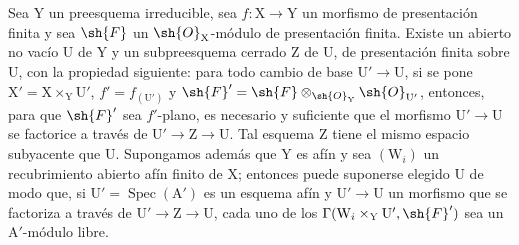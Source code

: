 \begin{proposition}[11.4.5]
\label{IV.11.4.5}
Sea $\mathrm{Y}$ un preesquema irreducible, sea $f:\mathrm{X}\to\mathrm{Y}$ un morfismo de
presentación finita y sea $\sh{F}$ un $\sh{O}_\mathrm{X}$-módulo de presentación finita. Existe un abierto no vacío $\mathrm{U}$
de $\mathrm{Y}$ y un subpreesquema cerrado $\mathrm{Z}$ de $\mathrm{U}$, de presentación finita sobre $\mathrm{U}$, con la propiedad siguiente:
para todo cambio de base $\mathrm{U}'\to\mathrm{U}$, si se pone $\mathrm{X}'=\mathrm{X}\times_\mathrm{Y}\mathrm{U}'$, $f'=f_{(\mathrm{U}')}$ y $\sh{F}'=\sh{F}\otimes_{\sh{O}_\mathrm{Y}}\sh{O}_{\mathrm{U}'}$,
entonces, para que $\sh{F}'$ sea $f'$-plano, es necesario y suficiente que el morfismo $\mathrm{U}'\to\mathrm{U}$ se factorice
a través de $\mathrm{U}'\to\mathrm{Z}\to\mathrm{U}$. Tal esquema $\mathrm{Z}$ tiene el mismo espacio subyacente que $\mathrm{U}$. Supongamos además que $\mathrm{Y}$ es afín
y sea $(\mathrm{W}_i)$ un recubrimiento abierto afín finito de $\mathrm{X}$; entonces puede suponerse elegido $\mathrm{U}$
de modo que, si $\mathrm{U}'=\operatorname{Spec}(\mathrm{A}')$ es un esquema afín y $\mathrm{U}'\to\mathrm{U}$ un morfismo que se factoriza
a través de $\mathrm{U}'\to\mathrm{Z}\to\mathrm{U}$, cada uno de los $\Gamma(\mathrm{W}_i\times_\mathrm{Y}\mathrm{U}',\sh{F}')$ sea un $\mathrm{A}'$-módulo libre.
\end{proposition}

